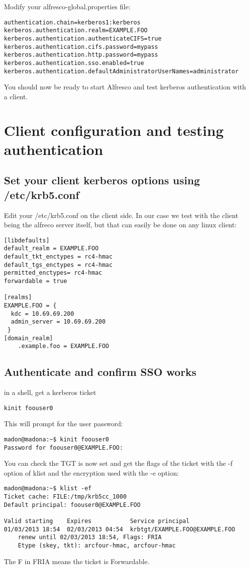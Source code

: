\documentclass[12pt,a4]{article}
\begin{document}
Modify your alfresco-global.properties file:
\begin{verbatim}
authentication.chain=kerberos1:kerberos
kerberos.authentication.realm=EXAMPLE.FOO
kerberos.authentication.authenticateCIFS=true
kerberos.authentication.cifs.password=mypass
kerberos.authentication.http.password=mypass
kerberos.authentication.sso.enabled=true
kerberos.authentication.defaultAdministratorUserNames=administrator
\end{verbatim}




You should now be ready to start Alfresco and test kerberos authentication with a client.

\section{Client configuration and testing authentication}

\subsection{Set your client kerberos options using /etc/krb5.conf}

Edit your /etc/krb5.conf on the client side. In our case we test with the client being the alfreco server itself, but that can easily be done on any linux client:


\begin{verbatim}
[libdefaults]
default_realm = EXAMPLE.FOO
default_tkt_enctypes = rc4-hmac
default_tgs_enctypes = rc4-hmac
permitted_enctypes= rc4-hmac
forwardable = true

[realms]
EXAMPLE.FOO = {
  kdc = 10.69.69.200
  admin_server = 10.69.69.200
 }
[domain_realm]
	.example.foo = EXAMPLE.FOO
\end{verbatim}

\subsection{Authenticate and confirm SSO works}
in a shell, get a kerberos ticket
\begin{verbatim}
kinit foouser0
\end{verbatim}
This will prompt for the user password:
\begin{verbatim}
madon@madona:~$ kinit foouser0
Password for foouser0@EXAMPLE.FOO: 
\end{verbatim}
You can check the TGT is now set and get the flags of the ticket with the -f option of klist and the encryption used with the -e option:
\begin{verbatim}
madon@madona:~$ klist -ef
Ticket cache: FILE:/tmp/krb5cc_1000
Default principal: foouser0@EXAMPLE.FOO

Valid starting    Expires           Service principal
01/03/2013 18:54  02/03/2013 04:54  krbtgt/EXAMPLE.FOO@EXAMPLE.FOO
	renew until 02/03/2013 18:54, Flags: FRIA
	Etype (skey, tkt): arcfour-hmac, arcfour-hmac 
\end{verbatim}
The F in FRIA means the ticket is Forwardable.
\end{document}
